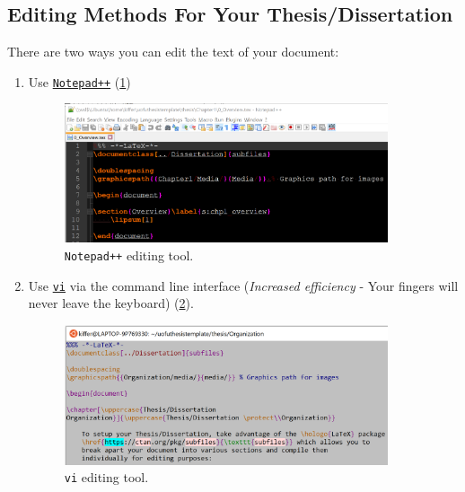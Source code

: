 \documentclass[../Dissertation]{subfiles}
\begin{document}
\subsection{Editing Methods For Your Thesis/Dissertation}
    There are two ways you can edit the text of your document:
    \begin{enumerate}
        \item Use \href{https://notepad-plus-plus.org/}{\texttt{Notepad++}} 
            (\cref{fig:Notepad})
            \begin{figure}[H]
                \centering
                \includegraphics[width=0.9\textwidth]
                {./Notepad}
                \caption{\texttt{Notepad++} editing tool.}
                \label{fig:Notepad}
            \end{figure}
        \item Use
            \href{https://www.tutorialspoint.com/unix/unix-vi-editor.htm}{\texttt{vi}}
            via the command line interface (\emph{Increased efficiency} - Your
            fingers will never leave the keyboard) (\cref{fig:vi_example}).
            \begin{figure}[H]
                \centering
                \includegraphics[width=0.9\textwidth]
                {./vi_example}
                \caption{\texttt{vi} editing tool.}
                \label{fig:vi_example}
            \end{figure}
    \end{enumerate}
    
\end{document}
